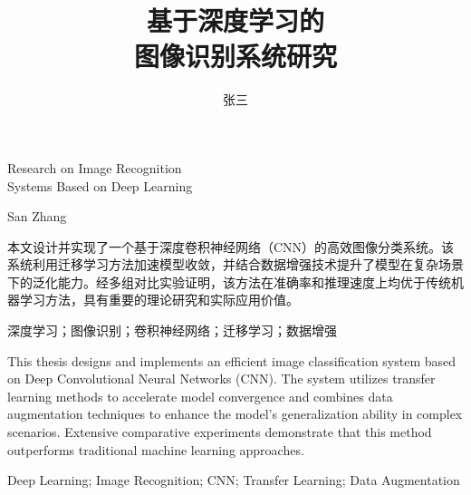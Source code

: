 \documentclass[utf8]{lightweight-thesis}
\begin{document}
    \frontmatter

    \title{%
        基于深度学习的 \\[18pt]
        图像识别系统研究
    }{%
        Research on Image Recognition\\[18pt]
        Systems Based on Deep Learning
    }

    \author{张三}{San Zhang}


    \date{}

    \maketitle


    \begin{abstract_cn}
        本文设计并实现了一个基于深度卷积神经网络（CNN）的高效图像分类系统。该系统利用迁移学习方法加速模型收敛，并结合数据增强技术提升了模型在复杂场景下的泛化能力。经多组对比实验证明，该方法在准确率和推理速度上均优于传统机器学习方法，具有重要的理论研究和实际应用价值。
    \end{abstract_cn}

    \begin{keywords_cn}
        深度学习；图像识别；卷积神经网络；迁移学习；数据增强
    \end{keywords_cn}

    \begin{abstract_en}
        This thesis designs and implements an efficient image classification system based on Deep Convolutional Neural Networks (CNN). The system utilizes transfer learning methods to accelerate model convergence and combines data augmentation techniques to enhance the model's generalization ability in complex scenarios. Extensive comparative experiments demonstrate that this method outperforms traditional machine learning approaches.
    \end{abstract_en}

    \begin{keywords_en}
        Deep Learning; Image Recognition; CNN; Transfer Learning; Data Augmentation
    \end{keywords_en}

    \tableofcontents
\end{document}
